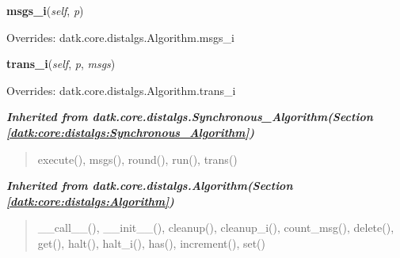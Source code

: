     \vspace{0.5ex}

\hspace{.8\funcindent}\begin{boxedminipage}{\funcwidth}

    \raggedright \textbf{msgs\_i}(\textit{self}, \textit{p})

\setlength{\parskip}{2ex}
\setlength{\parskip}{1ex}
      Overrides: datk.core.distalgs.Algorithm.msgs\_i

    \end{boxedminipage}

    \vspace{0.5ex}

\hspace{.8\funcindent}\begin{boxedminipage}{\funcwidth}

    \raggedright \textbf{trans\_i}(\textit{self}, \textit{p}, \textit{msgs})

\setlength{\parskip}{2ex}
\setlength{\parskip}{1ex}
      Overrides: datk.core.distalgs.Algorithm.trans\_i

    \end{boxedminipage}


\large{\textbf{\textit{Inherited from datk.core.distalgs.Synchronous\_Algorithm\textit{(Section \ref{datk:core:distalgs:Synchronous_Algorithm})}}}}

\begin{quote}
execute(), msgs(), round(), run(), trans()
\end{quote}

\large{\textbf{\textit{Inherited from datk.core.distalgs.Algorithm\textit{(Section \ref{datk:core:distalgs:Algorithm})}}}}

\begin{quote}
\_\_call\_\_(), \_\_init\_\_(), cleanup(), cleanup\_i(), count\_msg(), delete(), get(), halt(), halt\_i(), has(), increment(), set()
\end{quote}
